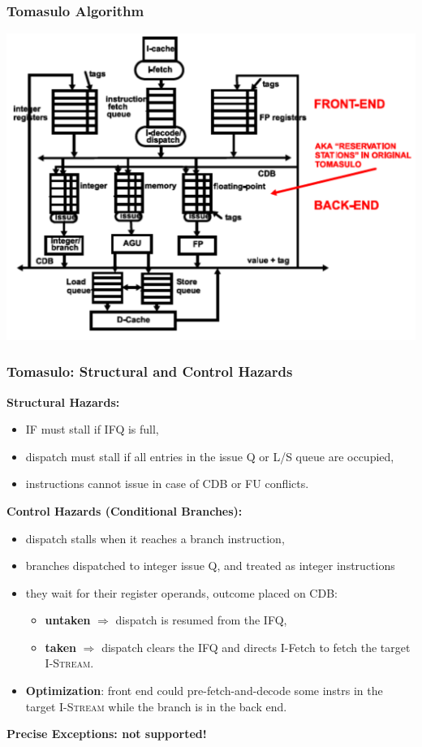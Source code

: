\documentclass{beamer}
\newcommand{\emp}[1]{\textcolor{DikuRed}{ #1}}
\newcommand{\emphh}[1]{\textcolor{CosGreen}{ #1}}
\begin{document}
\begin{frame}[fragile,t]
\frametitle{Tomasulo Algorithm}

\includegraphics[width=63ex]{FigsOoOProc/Tomasulo.pdf}

\end{frame}


\begin{frame}[fragile,t]
\frametitle{Tomasulo: Structural and Control Hazards}

\emp{\bf Structural Hazards:}
\begin{itemize}
    \item IF must stall if IFQ is full,
    \item dispatch must stall if all entries in the issue Q or L/S queue are occupied,
    \item instructions cannot issue in case of CDB or FU conflicts.
\end  {itemize}
\medskip


\emp{\bf Control Hazards (Conditional Branches):}
\begin{itemize}
    \item dispatch stalls when it reaches a branch instruction,
    \item branches dispatched to integer issue Q, and treated as integer instructions
    \item they wait for their register operands, outcome placed on CDB:
        \begin{itemize}
            \item \emphh{\bf untaken} $\Rightarrow$ dispatch is resumed from the IFQ,
            \item \emp{\bf taken} $\Rightarrow$ dispatch clears the IFQ and directs
                    {\textsc I-Fetch} to fetch the target \textsc{I-Stream}.
        \end  {itemize}
    \item \emphh{\bf Optimization}: front end could pre-fetch-and-decode some instrs
            in the target \textsc{I-Stream} while the branch is in the back end.
\end  {itemize}
\medskip

\alert{\bf Precise Exceptions: not supported!}

\end{frame}
\end{document}
